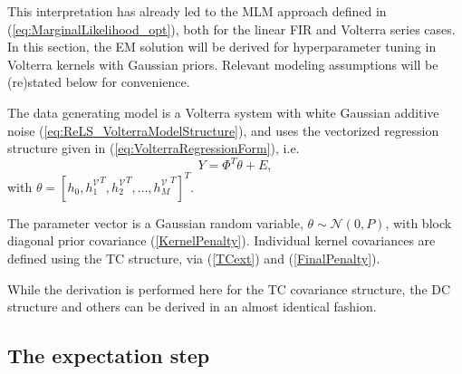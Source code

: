 This interpretation has already led to the MLM approach defined in (\ref{eq:MarginalLikelihood_opt}), both for the linear FIR and Volterra series cases. In this section, the EM solution will be derived for hyperparameter tuning in Volterra kernels with Gaussian priors. Relevant modeling assumptions will be (re)stated below for convenience.

\begin{assum}
The data generating model is a Volterra system with white Gaussian additive noise (\ref{eq:ReLS_VolterraModelStructure}), and uses the vectorized regression structure given in (\ref{eq:VolterraRegressionForm}), i.e.
\begin{equation}
\label{eq:VolterraRegressionForm_Chap4}
Y = \Phi^T \theta + E,
\end{equation}
with $\theta = [h_0, {h_1^\mathcal{V}}^T, {h_2^\mathcal{V}}^T, \hdots, {h_M^\mathcal{V}}^T]^T$.
\label{ass:ModelStructure_Chap4}
\end{assum}

\begin{assum}
The parameter vector is a Gaussian random variable, $\theta \sim \mathcal{N}(0,P)$, with block diagonal prior covariance (\ref{KernelPenalty}). Individual kernel covariances are defined using the TC structure, via (\ref{TCext}) and (\ref{FinalPenalty}).
\label{ass:GaussianTheta_Chap4}
\end{assum}

While the derivation is performed here for the TC covariance structure, the DC structure and others can be derived in an almost identical fashion.

\subsection{The expectation step}

